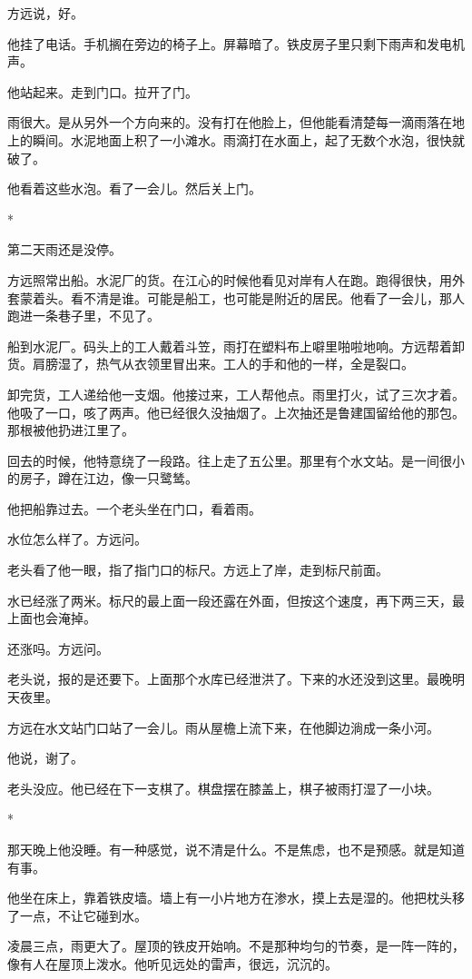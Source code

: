 \documentclass[UTF8,a5paper,11pt,openany]{ctexbook}
\newcommand{\scene}{\vspace{1em}\begin{center}*\quad*\quad*\end{center}\vspace{0.5em}}
\begin{document}
方远说，好。

他挂了电话。手机搁在旁边的椅子上。屏幕暗了。铁皮房子里只剩下雨声和发电机声。

他站起来。走到门口。拉开了门。

雨很大。是从另外一个方向来的。没有打在他脸上，但他能看清楚每一滴雨落在地上的瞬间。水泥地面上积了一小滩水。雨滴打在水面上，起了无数个水泡，很快就破了。

他看着这些水泡。看了一会儿。然后关上门。


\scene

第二天雨还是没停。

方远照常出船。水泥厂的货。在江心的时候他看见对岸有人在跑。跑得很快，用外套蒙着头。看不清是谁。可能是船工，也可能是附近的居民。他看了一会儿，那人跑进一条巷子里，不见了。

船到水泥厂。码头上的工人戴着斗笠，雨打在塑料布上噼里啪啦地响。方远帮着卸货。肩膀湿了，热气从衣领里冒出来。工人的手和他的一样，全是裂口。

卸完货，工人递给他一支烟。他接过来，工人帮他点。雨里打火，试了三次才着。他吸了一口，咳了两声。他已经很久没抽烟了。上次抽还是鲁建国留给他的那包。那根被他扔进江里了。

回去的时候，他特意绕了一段路。往上走了五公里。那里有个水文站。是一间很小的房子，蹲在江边，像一只鹭鸶。

他把船靠过去。一个老头坐在门口，看着雨。

水位怎么样了。方远问。

老头看了他一眼，指了指门口的标尺。方远上了岸，走到标尺前面。

水已经涨了两米。标尺的最上面一段还露在外面，但按这个速度，再下两三天，最上面也会淹掉。

还涨吗。方远问。

老头说，报的是还要下。上面那个水库已经泄洪了。下来的水还没到这里。最晚明天夜里。

方远在水文站门口站了一会儿。雨从屋檐上流下来，在他脚边淌成一条小河。

他说，谢了。

老头没应。他已经在下一支棋了。棋盘摆在膝盖上，棋子被雨打湿了一小块。


\scene

那天晚上他没睡。有一种感觉，说不清是什么。不是焦虑，也不是预感。就是知道有事。

他坐在床上，靠着铁皮墙。墙上有一小片地方在渗水，摸上去是湿的。他把枕头移了一点，不让它碰到水。

凌晨三点，雨更大了。屋顶的铁皮开始响。不是那种均匀的节奏，是一阵一阵的，像有人在屋顶上泼水。他听见远处的雷声，很远，沉沉的。
\end{document}
